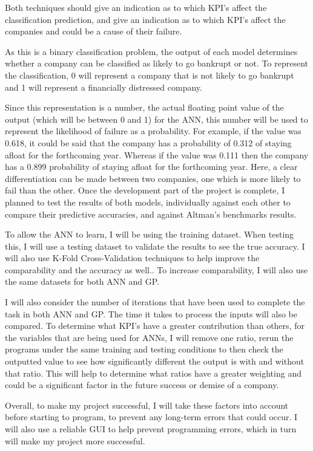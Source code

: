 \documentclass[11pt]{article}
\begin{document}
Both techniques should give an indication as to which KPI's affect the classification prediction, and give an indication as to which KPI's affect the companies and could be a cause of their failure. 

As this is a binary classification problem, the output of each model determines whether a company can be classified as likely to go bankrupt or not. To represent the classification,  0 will represent a company that is not likely to go bankrupt  and 1 will represent a financially distressed company.

Since this representation is a number, the actual floating point value of the output (which will be between 0 and 1) for the ANN, this number will be used to represent the likelihood of failure as a probability. For example, if the value was 0.618, it could be said that the company has a probability of 0.312 of staying afloat for the forthcoming year. Whereas if the value was 0.111 then the company has a 0.899 probability of staying afloat for the forthcoming year. Here, a clear differentiation can be made between two companies, one which is more likely to fail than the other.
Once the development part of the project is complete, I planned to test the results of both models, individually against each other to compare their predictive accuracies, and against Altman's benchmarks results.

To allow the ANN to learn, I will be using the training dataset. When testing this, I will use a testing dataset to validate the results to see the true accuracy. I will also use K-Fold Cross-Validation techniques to help improve the comparability and the accuracy as well.. To increase comparability, I will also use the same datasets for both ANN and GP.

I will also consider the number of iterations that have been used to complete the task in both ANN and GP. The time it takes to process the inputs will also be compared. To determine what KPI's have a greater contribution than others, for the variables that are being used for ANNs, I will remove one ratio, rerun the programs under the same training and testing conditions to then check the outputted value to see how significantly different the output is with and without that ratio. This will help to determine what ratios have a greater weighting and could be a significant factor in the future success or demise of a company. 

Overall, to make my project successful, I will take these factors into account before starting to program, to prevent any long-term errors that could occur. I will also use a reliable GUI to help prevent programming errors, which in turn will make my project more successful. 
\end{document}
